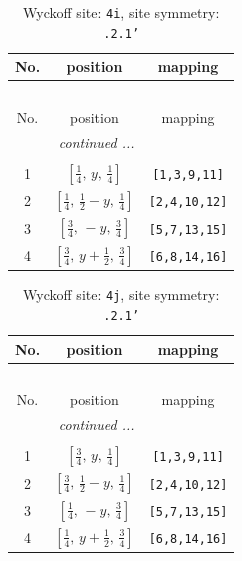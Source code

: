 \documentclass[fleqn,8pt]{jsarticle}
\begin{document}
\renewcommand{\arraystretch}{1.2}
\begin{longtable}{ccc}
\caption{Wyckoff site: {\tt 4i}, site symmetry: {\tt .2.1'}}
 \\
 \hline \hline
No. & position & mapping \\ \hline \endfirsthead

\multicolumn{2}{l}{\tablename\ \thetable{}} \\
 \hline \hline
No. & position & mapping \\ \hline \endhead

 \hline \hline
\multicolumn{2}{r}{\footnotesize\it continued ...} \\ \endfoot

 \hline \hline
\multicolumn{2}{r}{} \\ \endlastfoot

1 & $\left[ \frac{1}{4},\, y,\, \frac{1}{4} \right]$ & {\tt [1,3,9,11]} \\ \hline
2 & $\left[ \frac{1}{4},\, \frac{1}{2} - y,\, \frac{1}{4} \right]$ & {\tt [2,4,10,12]} \\ \hline
3 & $\left[ \frac{3}{4},\, - y,\, \frac{3}{4} \right]$ & {\tt [5,7,13,15]} \\ \hline
4 & $\left[ \frac{3}{4},\, y + \frac{1}{2},\, \frac{3}{4} \right]$ & {\tt [6,8,14,16]} \\
\end{longtable}
\renewcommand{\arraystretch}{1.2}
\begin{longtable}{ccc}
\caption{Wyckoff site: {\tt 4j}, site symmetry: {\tt .2.1'}}
 \\
 \hline \hline
No. & position & mapping \\ \hline \endfirsthead

\multicolumn{2}{l}{\tablename\ \thetable{}} \\
 \hline \hline
No. & position & mapping \\ \hline \endhead

 \hline \hline
\multicolumn{2}{r}{\footnotesize\it continued ...} \\ \endfoot

 \hline \hline
\multicolumn{2}{r}{} \\ \endlastfoot

1 & $\left[ \frac{3}{4},\, y,\, \frac{1}{4} \right]$ & {\tt [1,3,9,11]} \\ \hline
2 & $\left[ \frac{3}{4},\, \frac{1}{2} - y,\, \frac{1}{4} \right]$ & {\tt [2,4,10,12]} \\ \hline
3 & $\left[ \frac{1}{4},\, - y,\, \frac{3}{4} \right]$ & {\tt [5,7,13,15]} \\ \hline
4 & $\left[ \frac{1}{4},\, y + \frac{1}{2},\, \frac{3}{4} \right]$ & {\tt [6,8,14,16]} \\
\end{longtable}
\end{document}
